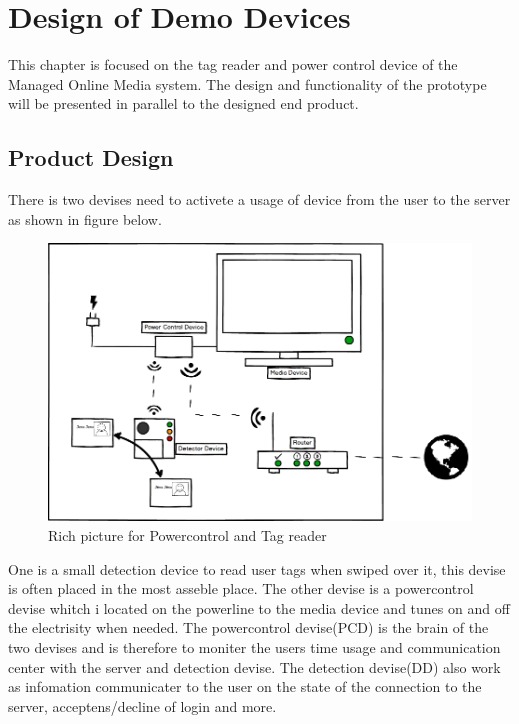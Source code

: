 \chapter{Design of Demo Devices}
This chapter is focused on the tag reader and power control device of the Managed Online Media system. \newline
The design and functionality of the prototype will be presented in parallel to the designed end product. \newline

\section{Product Design}

There is two devises need to activete a usage of device from the user to the server as shown in figure below.


\begin{figure}[h]
	\centering
		\includegraphics[width=1.00\textwidth]{images/Power&Tagdevice.png}
	\caption{Rich picture for Powercontrol and Tag reader}
	\label{fig:Power&Tagdevice}
\end{figure}

One is a small detection device to read user tags when swiped over it, this devise is often placed in the most asseble place. \newline
The other devise is a powercontrol devise whitch i located on the powerline to the media device and tunes on and off the electrisity when needed.\newline
The powercontrol devise(PCD) is the brain of the two devises and is therefore to moniter the users time usage and communication center with the server and detection devise. \newline
The detection devise(DD) also work as infomation communicater to the user on the state of the connection to the server, acceptens/decline of login and more. \newline    

